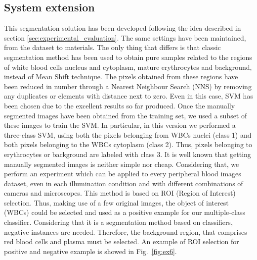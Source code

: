\documentclass[final,a4paper,12pt,english]{UnicaPhdThesis3}
\begin{document}
{\subsection{System extension} \label{caip2015}  %
This segmentation solution has been developed following the idea described in section \ref{sec:experimental_evaluation}.
The same settings have been maintained, from the dataset to materials. The only thing that differs is that classic segmentation method has been used to obtain pure samples related to the regions of white blood cells nucleus and cytoplasm, mature erythrocytes and background, instead of Mean Shift technique. The pixels obtained from these regions have been reduced in number through a Nearest Neighbour Search (NNS) by removing any duplicates or elements with distance next to zero. Even in this case, SVM has been chosen due to the excellent results so far produced. Once the manually segmented images have been obtained from the training set, we used a subset of these images to train the SVM. In particular, in this version we performed a three-class SVM, using both the pixels belonging from WBCs nuclei (class 1) and both pixels belonging to the WBCs cytoplasm (class 2). Thus, pixels belonging to erythrocytes or background are labeled with class 3. 
It is well known that getting manually segmented images is neither simple nor cheap. Considering that, we perform an experiment which can be applied to every peripheral blood images dataset, even in each illumination condition and with different combinations of cameras and microscopes. 
This method is based on ROI (Region of Interest) selection. Thus, making use of a few original images, the object of interest (WBCs) could be selected and used as a positive example for our multiple-class classifier. Considering that it is a segmentation method based on classifiers, negative instances are needed. Therefore, the background region, that comprises red blood cells and plasma must be selected. An example of ROI selection for positive and negative example is showed in Fig.~\ref{fig:ex6}.

}
\end{document}
